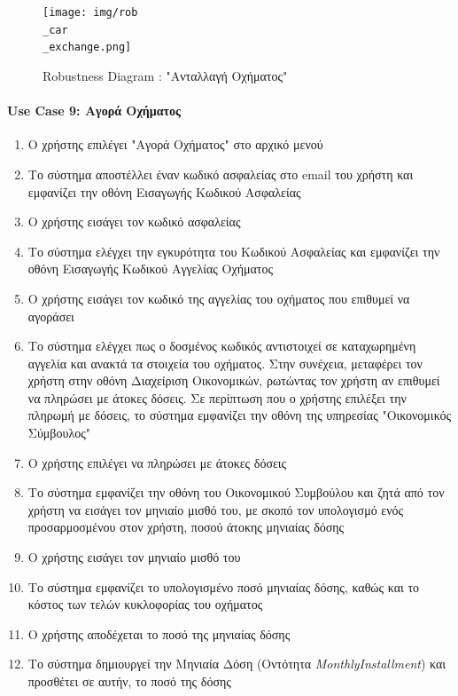 \documentclass{../ol-softwaremanual}
\begin{document}
	\begin{figure}[htbp!]
		\texttt{[image: img/rob\\\_car\\\_exchange.png]}
		\caption{\en Robustness Diagram : "\gr Ανταλλαγή Οχήματος\en"\gr}
	\end{figure}
	
	
	
	\newpage
	\centering
	
	\paragraph{\en Use Case 9: \gr Αγορά Οχήματος\gr}
	
	\begin{enumerate}
		\item Ο χρήστης επιλέγει \en"\gr Αγορά Οχήματος\en" \gr στο αρχικό μενού
		\item Το σύστημα αποστέλλει έναν κωδικό ασφαλείας στο \en email \gr του χρήστη και εμφανίζει την οθόνη Εισαγωγής Κωδικού Ασφαλείας
		\item Ο χρήστης εισάγει τον κωδικό ασφαλείας		
		\item Το σύστημα ελέγχει την εγκυρότητα του Κωδικού Ασφαλείας και εμφανίζει την οθόνη Εισαγωγής Κωδικού Αγγελίας Οχήματος
		\item Ο χρήστης εισάγει τον κωδικό της αγγελίας	του οχήματος που επιθυμεί να αγοράσει
		\item Το σύστημα ελέγχει πως ο δοσμένος κωδικός αντιστοιχεί σε καταχωρημένη αγγελία και ανακτά τα στοιχεία του οχήματος. Στην συνέχεια, μεταφέρει τον χρήστη στην οθόνη Διαχείριση Οικονομικών, ρωτώντας τον χρήστη αν επιθυμεί να πληρώσει με άτοκες δόσεις. Σε περίπτωση που ο χρήστης επιλέξει την πληρωμή με δόσεις, το σύστημα εμφανίζει την οθόνη της υπηρεσίας \en"\gr Οικονομικός Σύμβουλος\en"\gr
		\item Ο χρήστης επιλέγει να πληρώσει με άτοκες δόσεις
		\item Το σύστημα εμφανίζει την οθόνη του Οικονομικού Συμβούλου και ζητά από τον χρήστη να εισάγει τον μηνιαίο μισθό του, με σκοπό τον υπολογισμό ενός προσαρμοσμένου στον χρήστη, ποσού άτοκης μηνιαίας δόσης
		\item Ο χρήστης εισάγει τον μηνιαίο μισθό του
		\item Το σύστημα εμφανίζει το υπολογισμένο ποσό μηνιαίας δόσης, καθώς και το κόστος των τελών κυκλοφορίας του οχήματος
		\item Ο χρήστης αποδέχεται το ποσό της μηνιαίας δόσης
		\item Το σύστημα δημιουργεί την Μηνιαία Δόση (Οντότητα \en \textit{MonthlyInstallment}\gr) και προσθέτει σε αυτήν, το ποσό της δόσης		

\end{enumerate}
\end{document}
